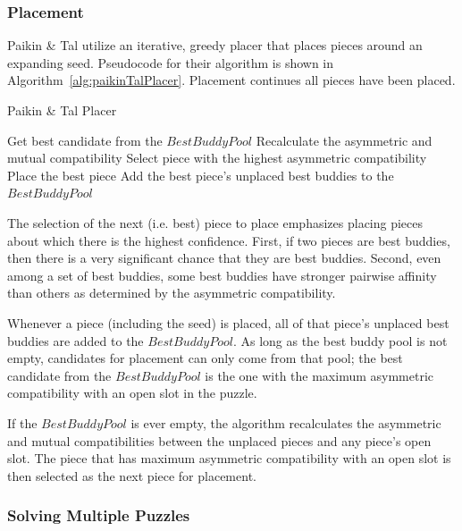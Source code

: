 \documentclass{report}
\begin{document}
\subsubsection{Placement}\label{sec:paikinTalPlacer}

Paikin \& Tal utilize an iterative, greedy placer that places pieces around an expanding seed.  Pseudocode for their algorithm is shown in Algorithm~\ref{alg:paikinTalPlacer}.  Placement continues all pieces have been placed.

\begin{algorithm}
\caption{Paikin \& Tal Placer}\label{alg:paikinTalPlacer}
\begin{algorithmic}[1]

      \State Get best candidate from the $BestBuddyPool$
   \Else
      \State Recalculate the asymmetric and mutual compatibility
      \State Select piece with the highest asymmetric compatibility
   \EndIf  
   \State Place the best piece
   \State Add the best piece's unplaced best buddies to the $BestBuddyPool$

\EndWhile
\end{algorithmic}
\end{algorithm}

The selection of the next (i.e. best) piece to place emphasizes placing pieces about which there is the highest confidence.  First, if two pieces are best buddies, then there is a very significant chance that they are best buddies.  Second, even among a set of best buddies, some best buddies have stronger pairwise affinity than others as determined by the asymmetric compatibility.

Whenever a piece (including the seed) is placed, all of that piece's unplaced best buddies are added to the $BestBuddyPool$.  As long as the best buddy pool is not empty, candidates for placement can only come from that pool; the best candidate from the $BestBuddyPool$ is the one with the maximum asymmetric compatibility with an open slot in the puzzle.  

If the $BestBuddyPool$ is ever empty, the algorithm recalculates the asymmetric and mutual compatibilities between the unplaced pieces and any piece's open slot.  The piece that has maximum asymmetric compatibility with an open slot is then selected as the next piece for placement.

\subsubsection{Solving Multiple Puzzles}\label{sec:solvingMultiplePuzzles}
\end{document}
